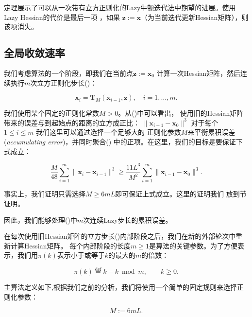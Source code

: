 \documentclass[a4paper,twoside,AutoFakeBold]{article}
\theoremstyle{definition}
\begin{document}
定理展示了可以从一次带有立方正则化的Lazy牛顿迭代法中期望的进展。使用Lazy Hessian的代价是最后一项
，如果 \(\mathbf{z} := \mathbf{x}\)（为当前迭代更新Hessian矩阵），则该项消失。

\newpage

\subsection{全局收敛速率}\label{sec:3}

我们考虑算法的一个阶段，即我们在当前点\(\mathbf{z} := \mathbf{x}_0\)
计算一次Hessian矩阵，然后连续执行\(m\)次立方正则化步长()：

\begin{equation}\label{8}
	\mathbf{x}_i = \mathbf{T}_M(\mathbf{x}_{i-1}, \mathbf{z}), \quad i = 1, \ldots, m. \tag{8}
\end{equation}


我们使用某个固定的正则化常数\(M > 0\)。从()中可以看出，
使用旧的Hessian矩阵带来的误差与到起始点的距离的立方成正比：
\(\|\mathbf{x}_{i-1} - \mathbf{x}_0\|^3\) 对于每个 \(1 \leq i \leq m\)
我们这里可以通过选择一个足够大的
正则化参数\(M\)来平衡累积误差(\textit{accumulating error})，并同时聚合()
中的正项。在这里，我们的目标是要保证下式成立：

\begin{equation}\label{9}
\frac{M}{48} \sum_{i=1}^{m} \|\mathbf{x}_i - \mathbf{x}_{i-1}\|^3 \geq 
\frac{11L^3}{M^2} \sum_{i=1}^{m} \|\mathbf{x}_{i-1} - \mathbf{x}_0\|^3.\tag{9}
\end{equation}

事实上，我们证明只需选择\(\boxed{M \geq 6mL}\)即可保证上式成立。{\color{blue}这里的证明我们
放到节证明。}


因此，我们能够处理()中\(m\)次连续Lazy步长的累积误差。

在每次使用旧Hessian矩阵的立方步长()内部阶段之后，我们在新的外部轮次中重新计算Hessian矩阵。
每个内部阶段的长度\(m \geq 1\)是算法的关键参数。为了方便表示，我们用\(\pi(k)\)表示小于或等于\(k\)的最大的\(m\)的倍数：

\begin{equation}\label{10}
\pi(k) \stackrel{\text{def}}{=} k - k \bmod m, \qquad k \geq 0. \tag{10}
\end{equation}

主算法定义如下,根据我们之前的分析，我们将使用一个简单的固定规则来选择正则化参数：

\begin{equation}\label{11}
\boxed{M := 6mL}. \tag{11}
\end{equation}
\end{document}

